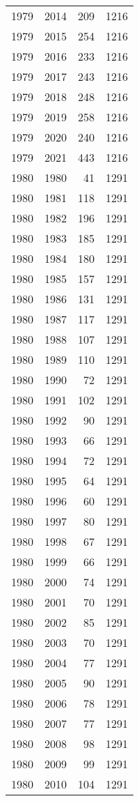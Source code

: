 \documentclass[
  10pt,
  letterpaper,
  DIV=11,
  numbers=noendperiod,
  twoside]{scrartcl}
\begin{document}
\begin{longtable}[]{@{}rrrr@{}}
1979 & 2014 & 209 & 1216 \\
1979 & 2015 & 254 & 1216 \\
1979 & 2016 & 233 & 1216 \\
1979 & 2017 & 243 & 1216 \\
1979 & 2018 & 248 & 1216 \\
1979 & 2019 & 258 & 1216 \\
1979 & 2020 & 240 & 1216 \\
1979 & 2021 & 443 & 1216 \\
1980 & 1980 & 41 & 1291 \\
1980 & 1981 & 118 & 1291 \\
1980 & 1982 & 196 & 1291 \\
1980 & 1983 & 185 & 1291 \\
1980 & 1984 & 180 & 1291 \\
1980 & 1985 & 157 & 1291 \\
1980 & 1986 & 131 & 1291 \\
1980 & 1987 & 117 & 1291 \\
1980 & 1988 & 107 & 1291 \\
1980 & 1989 & 110 & 1291 \\
1980 & 1990 & 72 & 1291 \\
1980 & 1991 & 102 & 1291 \\
1980 & 1992 & 90 & 1291 \\
1980 & 1993 & 66 & 1291 \\
1980 & 1994 & 72 & 1291 \\
1980 & 1995 & 64 & 1291 \\
1980 & 1996 & 60 & 1291 \\
1980 & 1997 & 80 & 1291 \\
1980 & 1998 & 67 & 1291 \\
1980 & 1999 & 66 & 1291 \\
1980 & 2000 & 74 & 1291 \\
1980 & 2001 & 70 & 1291 \\
1980 & 2002 & 85 & 1291 \\
1980 & 2003 & 70 & 1291 \\
1980 & 2004 & 77 & 1291 \\
1980 & 2005 & 90 & 1291 \\
1980 & 2006 & 78 & 1291 \\
1980 & 2007 & 77 & 1291 \\
1980 & 2008 & 98 & 1291 \\
1980 & 2009 & 99 & 1291 \\
1980 & 2010 & 104 & 1291 \\

\end{longtable}
\end{document}
